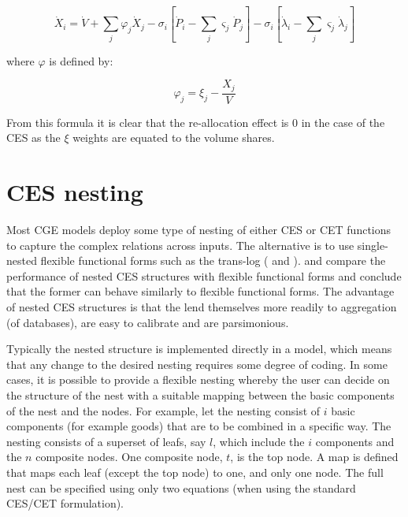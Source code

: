 \begin{equation}
\label{eq:CRESHAllocXlin2}
\dot X_i = \dot V + \sum_j{\varphi_j \dot X_j}
- \sigma_i\left[ \dot P_i - \sum_j{\varsigma_j} \dot P_j\right]
- \sigma_i\left[ \dot \lambda_i - \sum_j{\varsigma_j} \dot \lambda_j \right]
\end{equation}

\noindent where $\varphi$ is defined by:

\begin{displaymath}
\varphi_j = \xi_j - \frac{{X_j}}{V}
\end{displaymath}

\noindent From this formula it is clear that the re-allocation effect
is 0 in the case of the CES as the $\xi$ weights are equated to the volume shares.

\section{CES nesting}

Most CGE models deploy some type of nesting of either
CES or CET functions to capture the complex relations
across inputs. The alternative is to use single-nested
flexible functional forms such as the trans-log (\cite{Christensenetal1973} and \cite{Jorgensonetal2013}).
\cite{PerroniRutherford1995} and \cite{PerroniRutherford1998}
compare the performance of nested CES structures with
flexible functional forms and conclude that the former
can behave similarly to flexible functional forms. The
advantage of nested CES structures is that the lend
themselves more readily to aggregation (of databases),
are easy to calibrate and are parsimonious.

Typically the nested structure is implemented
directly in a model, which means that any change to
the desired nesting requires some degree of coding. In
some cases, it is possible to provide a flexible
nesting whereby the user can decide on the structure
of the nest with a suitable mapping between the basic
components of the nest and the nodes. For example,
let the nesting consist of $i$ basic components (for
example goods) that are to be combined in a specific way.
The nesting consists of a superset of leafs, say $l$,
which include the $i$ components and the $n$ composite nodes.
One composite node, $t$, is the top node. A map is
defined that maps each leaf (except the top node) to
one, and only one node. The full nest can be specified using
only two equations (when using the standard CES/CET formulation).

